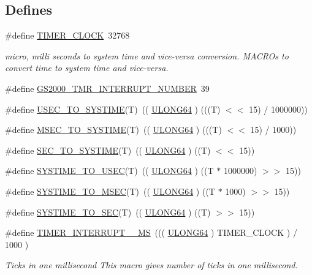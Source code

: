 \subsection*{Defines}
\begin{DoxyCompactItemize}
\item 
\#define \hyperlink{a00673_ga05ec5d63e2ba7621d706137124efca7d}{TIMER\_\-CLOCK}~32768
\begin{DoxyCompactList}\small\item\em micro, milli seconds to system time and vice-\/versa conversion. MACROs to convert time to system time and vice-\/versa. \end{DoxyCompactList}\item 
\#define \hyperlink{a00586_a5e020cc782064f4e8b7ba19f9380a484}{GS2000\_\-TMR\_\-INTERRUPT\_\-NUMBER}~39
\item 
\#define \hyperlink{a00586_a25d1fcc71108d05dc93def69410e9f16}{USEC\_\-TO\_\-SYSTIME}(T)~(( \hyperlink{a00660_ga28961430434ccabca6862ea93fe9a15b}{ULONG64} ) (((T) $<$$<$ 15) / 1000000))
\item 
\#define \hyperlink{a00586_a4eec8731cd2a25e176800a1d878bcfe2}{MSEC\_\-TO\_\-SYSTIME}(T)~(( \hyperlink{a00660_ga28961430434ccabca6862ea93fe9a15b}{ULONG64} ) (((T) $<$$<$ 15) / 1000))
\item 
\#define \hyperlink{a00586_a3f7d544fa099e7d8c53dc3893e3e1021}{SEC\_\-TO\_\-SYSTIME}(T)~(( \hyperlink{a00660_ga28961430434ccabca6862ea93fe9a15b}{ULONG64} ) ((T) $<$$<$ 15))
\item 
\#define \hyperlink{a00586_afd941402d8fc4e4f2be92021c03896c8}{SYSTIME\_\-TO\_\-USEC}(T)~(( \hyperlink{a00660_ga28961430434ccabca6862ea93fe9a15b}{ULONG64} ) ((T $\ast$ 1000000) $>$$>$ 15))
\item 
\#define \hyperlink{a00586_a71779934d72f2dfa777d9e6b964e9830}{SYSTIME\_\-TO\_\-MSEC}(T)~(( \hyperlink{a00660_ga28961430434ccabca6862ea93fe9a15b}{ULONG64} ) ((T $\ast$ 1000) $>$$>$ 15))
\item 
\#define \hyperlink{a00586_afb7802e984a412ff26eafcc98e49a1e3}{SYSTIME\_\-TO\_\-SEC}(T)~(( \hyperlink{a00660_ga28961430434ccabca6862ea93fe9a15b}{ULONG64} ) ((T) $>$$>$ 15))
\item 
\#define \hyperlink{a00673_gad5a672b2263743c1daf0ee6797d2fbfd}{TIMER\_\-INTERRUPT\_\_\-MS}~((( \hyperlink{a00660_ga28961430434ccabca6862ea93fe9a15b}{ULONG64} ) TIMER\_\-CLOCK ) / 1000 )
\begin{DoxyCompactList}\small\item\em Ticks in one millisecond This macro gives number of ticks in one millisecond. \end{DoxyCompactList}\item 

\end{DoxyCompactItemize}
